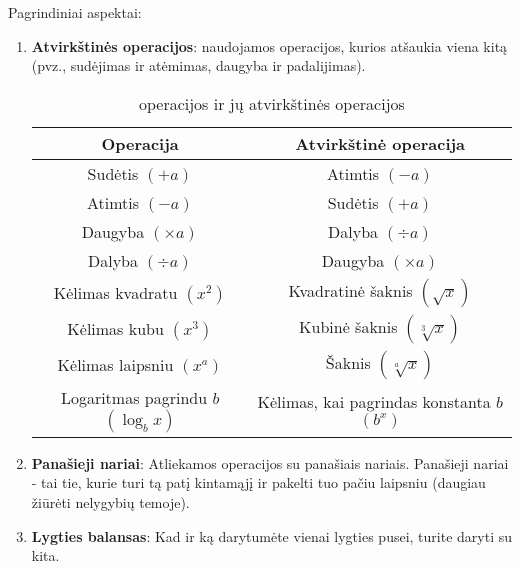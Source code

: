 \documentclass[a4paper]{article}
\begin{document}
Pagrindiniai aspektai:
\begin{enumerate}
      \item \textbf{Atvirkštinės operacijos}:
            naudojamos operacijos, kurios atšaukia viena kitą (pvz., sudėjimas
            ir atėmimas, daugyba ir padalijimas).

            \begin{table}[h]
                  \centering
                  \begin{tabular}{cc}
                        \toprule
                        Operacija                                & Atvirkštinė
                        operacija
                        \\
                        \midrule
                        Sudėtis $(+a)$                           & Atimtis
                        $(-a)$
                        \\
                        Atimtis $(-a)$                           & Sudėtis
                        $(+a)$
                        \\
                        Daugyba $(\times a)$                     & Dalyba
                        $(\div a)$
                        \\
                        Dalyba $(\div a)$                        & Daugyba
                        $(\times
                              a)$
                        \\
                        Kėlimas kvadratu $(x^2)$                 & Kvadratinė
                        šaknis
                        $(\sqrt{x})$
                        \\
                        Kėlimas kubu $(x^3)$                     & Kubinė
                        šaknis
                        $(\sqrt[3]{x})$
                        \\
                        Kėlimas laipsniu $(x^a)$                 & Šaknis
                        \((\sqrt[a]{x})\)
                        \\
                        Logaritmas pagrindu  \(b\) $(\log_b{x})$ & Kėlimas, kai
                        pagrindas konstanta \(b\) $(b^x)$
                        \\
                        \bottomrule
                  \end{tabular}
                  \caption{operacijos ir jų atvirkštinės operacijos}
                  \label{tab:inverse_operations}
            \end{table}

      \item \textbf{Panašieji nariai}: Atliekamos operacijos su panašiais
            nariais. Panašieji nariai - tai tie, kurie turi tą patį kintamąjį
            ir pakelti
            tuo pačiu laipsniu (daugiau žiūrėti nelygybių temoje).
      \item \textbf{Lygties balansas}: Kad ir ką darytumėte vienai lygties
            pusei, turite daryti su kita.
\end{enumerate}
\end{document}
